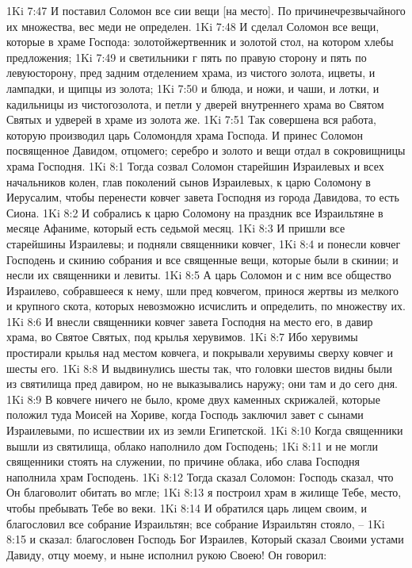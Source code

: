 1Ki 7:47  И поставил Соломон все сии вещи [на место]. По причинечрезвычайного их множества, вес меди не определен.
1Ki 7:48  И сделал Соломон все вещи, которые в храме Господа: золотойжертвенник и золотой стол, на котором хлебы предложения;
1Ki 7:49  и светильники г пять по правую сторону и пять по левуюсторону, пред задним отделением храма, из чистого золота, ицветы, и лампадки, и щипцы из золота;
1Ki 7:50  и блюда, и ножи, и чаши, и лотки, и кадильницы из чистогозолота, и петли у дверей внутреннего храма во Святом Святых и удверей в храме из золота же.
1Ki 7:51  Так совершена вся работа, которую производил царь Соломондля храма Господа. И принес Соломон посвященное Давидом, отцомего; серебро и золото и вещи отдал в сокровищницы храма Господня.
1Ki 8:1  Тогда созвал Соломон старейшин Израилевых и всех начальников колен, глав поколений сынов Израилевых, к царю Соломону в Иерусалим, чтобы перенести ковчег завета Господня из города Давидова, то есть Сиона.
1Ki 8:2  И собрались к царю Соломону на праздник все Израильтяне в месяце Афаниме, который есть седьмой месяц.
1Ki 8:3  И пришли все старейшины Израилевы; и подняли священники ковчег,
1Ki 8:4  и понесли ковчег Господень и скинию собрания и все священные вещи, которые были в скинии; и несли их священники и левиты.
1Ki 8:5  А царь Соломон и с ним все общество Израилево, собравшееся к нему, шли пред ковчегом, принося жертвы из мелкого и крупного скота, которых невозможно исчислить и определить, по множеству их.
1Ki 8:6  И внесли священники ковчег завета Господня на место его, в давир храма, во Святое Святых, под крылья херувимов.
1Ki 8:7  Ибо херувимы простирали крылья над местом ковчега, и покрывали херувимы сверху ковчег и шесты его.
1Ki 8:8  И выдвинулись шесты так, что головки шестов видны были из святилища пред давиром, но не выказывались наружу; они там и до сего дня.
1Ki 8:9  В ковчеге ничего не было, кроме двух каменных скрижалей, которые положил туда Моисей на Хориве, когда Господь заключил завет с сынами Израилевыми, по исшествии их из земли Египетской.
1Ki 8:10  Когда священники вышли из святилища, облако наполнило дом Господень;
1Ki 8:11  и не могли священники стоять на служении, по причине облака, ибо слава Господня наполнила храм Господень.
1Ki 8:12  Тогда сказал Соломон: Господь сказал, что Он благоволит обитать во мгле;
1Ki 8:13  я построил храм в жилище Тебе, место, чтобы пребывать Тебе во веки.
1Ki 8:14  И обратился царь лицем своим, и благословил все собрание Израильтян; все собрание Израильтян стояло, --
1Ki 8:15  и сказал: благословен Господь Бог Израилев, Который сказал Своими устами Давиду, отцу моему, и ныне исполнил рукою Своею! Он говорил:
